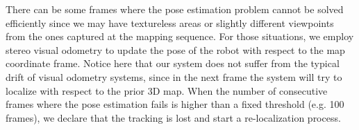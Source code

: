 There can be some frames where the pose estimation problem cannot be solved efficiently since we may have textureless areas or slightly different viewpoints from the ones captured at the mapping sequence. For those situations, we employ stereo visual odometry to update the pose of the robot with respect to the map coordinate frame. Notice here that our system does not suffer from the typical drift of visual odometry systems, since in the next frame the system will try to localize with respect to the prior 3D map. When the number of consecutive frames where the pose estimation fails is higher than a fixed threshold (e.g. 100 frames), we declare that the tracking is lost and start a re-localization process. 

%
%
